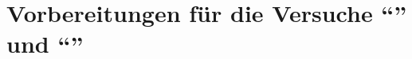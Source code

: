 \documentclass[../protokoll.tex]{subfiles}
\begin{document}
\section{Vorbereitungen für die Versuche "`"' und "`"'}
\end{document}
